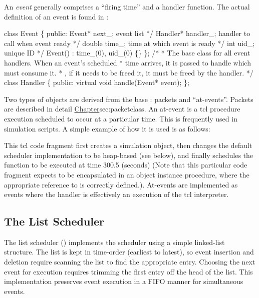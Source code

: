 An {\em event} generally comprises a ``firing time'' and a handler function.
The actual definition of an event is found in :
\begin{program}
        class Event \{ 
        public: 
                Event* next_;           \* event list */ 
                Handler* handler_;      \* handler to call when event ready */
                double time_;           \* time at which event is ready */
                int uid_;               \* unique ID */
                Event() : time_(0), uid_(0) \{\}
        \};   
        /*   
         * {\cf The base class for all event handlers.  When an event's scheduled}
         * {\cf time arrives, it is passed to handle which must consume it.}
         * {\ie, if it needs to be freed it, it must be freed by the handler.}
         */  
        class Handler \{
         public: 
                virtual void handle(Event* event);
        \};   
\end{program}
Two types of objects are derived from the base
: packets and ``at-events''.
Packets are described in detail 
\href{in the next chapter}{Chapter}{sec:packetclass}.
An at-event is a tcl procedure execution scheduled to occur at
a particular time. 
This is frequently used in simulation scripts.
A simple example of how it is used is as follows:
This tcl code fragment first creates a simulation object,
then changes the default scheduler implementation to be heap-based
(see below), and finally schedules the function 
to be executed at time 300.5 (seconds)%
(Note that this particular code fragment expects to be encapsulated 
in an object instance procedure, where the appropriate
reference to  is correctly defined.).
At-events are implemented as events where the handler is
effectively an execution of the tcl interpreter.

\subsection{The List Scheduler}
\label{sec:listsched}

The list scheduler ()
implements the scheduler using a simple linked-list structure.
The list is kept in time-order (earliest to latest), so event
insertion and deletion require scanning the list to find the
appropriate entry.
Choosing the next event for execution requires trimming the first
entry off the head of the list.
This implementation preserves event execution in a FIFO manner
for simultaneous events.

